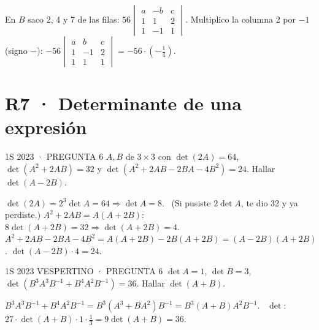 En $B$ saco 2, 4 y 7 de las filas: $56\begin{vmatrix}a&-b&c\\1&1&2\\1&-1&1\end{vmatrix}$.
Multiplico la columna 2 por $-1$ (signo $-$): $-56\begin{vmatrix}a&b&c\\1&-1&2\\1&1&1\end{vmatrix}=-56\cdot\left(-\frac14\right)$.

\section*{R7 · Determinante de una expresión}
\begin{enunciado}{1S 2023 · PREGUNTA 6}
$A,B$ de $3\times3$ con $\det(2A)=64$, $\det(A^2+2AB)=32$ y $\det(A^2+2AB-2BA-4B^2)=24$. Hallar $\det(A-2B)$.
\end{enunciado}
$\det(2A)=2^3\det A=64\Rightarrow\det A=8$. \ (Si pusiste $2\det A$, te dio 32 y ya perdiste.)
$A^2+2AB=A(A+2B)$: \ $8\det(A+2B)=32\Rightarrow\det(A+2B)=4$.\\
$A^2+2AB-2BA-4B^2=A(A+2B)-2B(A+2B)=(A-2B)(A+2B)$.
$\det(A-2B)\cdot4=24$.
\begin{enunciado}{1S 2023 VESPERTINO · PREGUNTA 6}
$\det A=1$, $\det B=3$, $\det(B^3A^3B^{-1}+B^4A^2B^{-1})=36$. Hallar $\det(A+B)$.
\end{enunciado}
$B^3A^3B^{-1}+B^4A^2B^{-1}=B^3(A^3+BA^2)B^{-1}=B^3(A+B)A^2B^{-1}$. \ $\det$: $27\cdot\det(A+B)\cdot1\cdot\frac13=9\det(A+B)=36$.

